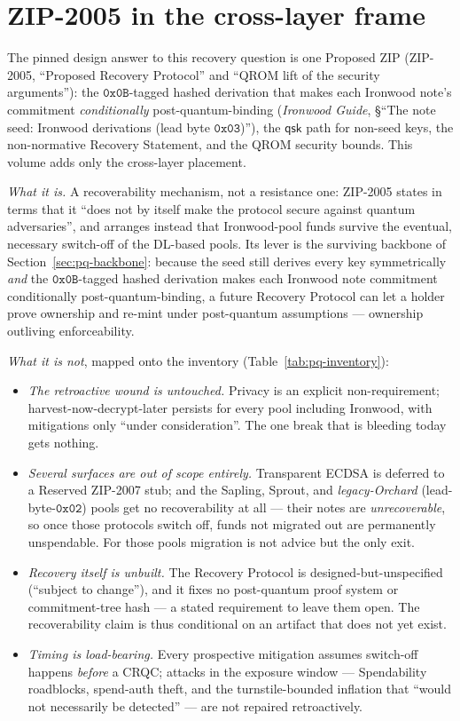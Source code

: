\documentclass[11pt,a4paper]{article}
\theoremstyle{definition}
\begin{document}
\section{ZIP-2005 in the cross-layer frame}\label{sec:pq-2005}

The pinned design answer to this recovery question is one Proposed ZIP
(ZIP-2005, ``Proposed Recovery Protocol'' and ``QROM lift of the security
arguments''): the $\mathtt{0x0B}$-tagged
hashed derivation that makes each Ironwood note's commitment
\emph{conditionally} post-quantum-binding (\emph{Ironwood Guide},
\S``The note seed: Ironwood derivations (lead byte $\mathtt{0x03}$)''),
the $\mathsf{qsk}$ path for non-seed keys, the non-normative Recovery
Statement, and the QROM security bounds. This volume adds only the
cross-layer placement.

\emph{What it is.} A recoverability mechanism, not a resistance one:
ZIP-2005 states in terms that it ``does not by itself make the protocol
secure against quantum adversaries'', and arranges instead that
Ironwood-pool funds survive the eventual, necessary switch-off of the
DL-based pools. Its lever is the surviving backbone of
Section~\ref{sec:pq-backbone}: because the seed still derives every key
symmetrically \emph{and} the $\mathtt{0x0B}$-tagged hashed derivation
makes each Ironwood note commitment conditionally post-quantum-binding,
a future Recovery Protocol can let a holder prove ownership and re-mint
under post-quantum assumptions --- ownership outliving enforceability.

\emph{What it is not}, mapped onto the inventory
(Table~\ref{tab:pq-inventory}):

\begin{itemize}[leftmargin=*]
\item \emph{The retroactive wound is untouched.} Privacy is an explicit
non-requirement; harvest-now-decrypt-later persists for every pool
including Ironwood, with mitigations only ``under consideration''. The
one break that is bleeding today gets nothing.
\item \emph{Several surfaces are out of scope entirely.} Transparent
ECDSA is deferred to a Reserved ZIP-2007 stub; and the Sapling, Sprout,
and \emph{legacy-Orchard} (lead-byte-$\mathtt{0x02}$) pools get no
recoverability at all --- their notes are \emph{unrecoverable}, so once
those protocols switch off, funds not migrated out are permanently
unspendable. For those pools migration is not advice but the only exit.
\item \emph{Recovery itself is unbuilt.} The Recovery Protocol is
designed-but-unspecified (``subject to change''), and it fixes no
post-quantum proof system or commitment-tree hash --- a stated
requirement to leave them open. The recoverability claim is thus
conditional on an artifact that does not yet exist.
\item \emph{Timing is load-bearing.} Every prospective mitigation
assumes switch-off happens \emph{before} a CRQC; attacks in the
exposure window --- Spendability roadblocks, spend-auth theft, and the
turnstile-bounded inflation that ``would not necessarily be detected''
--- are not repaired retroactively.
\end{itemize}
\end{document}
